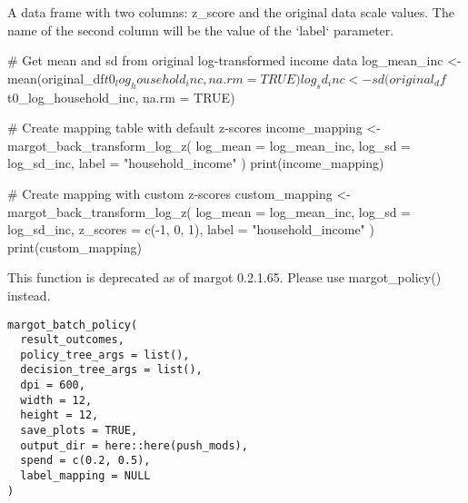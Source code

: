 \documentclass[a4paper]{book}
\begin{document}
%
\begin{Value}
A data frame with two columns: z\_score and the original data scale values.
The name of the second column will be the value of the `label` parameter.
\end{Value}
%
\begin{Examples}
\begin{ExampleCode}
# Get mean and sd from original log-transformed income data
log_mean_inc <- mean(original_df$t0_log_household_inc, na.rm = TRUE)
log_sd_inc <- sd(original_df$t0_log_household_inc, na.rm = TRUE)

# Create mapping table with default z-scores
income_mapping <- margot_back_transform_log_z(
  log_mean = log_mean_inc,
  log_sd = log_sd_inc,
  label = "household_income"
)
print(income_mapping)

# Create mapping with custom z-scores
custom_mapping <- margot_back_transform_log_z(
  log_mean = log_mean_inc,
  log_sd = log_sd_inc,
  z_scores = c(-1, 0, 1),
  label = "household_income"
)
print(custom_mapping)

\end{ExampleCode}
\end{Examples}
%
\begin{Description}
This function is deprecated as of margot 0.2.1.65. Please use margot\_policy() instead.
\end{Description}
%
\begin{Usage}
\begin{verbatim}
margot_batch_policy(
  result_outcomes,
  policy_tree_args = list(),
  decision_tree_args = list(),
  dpi = 600,
  width = 12,
  height = 12,
  save_plots = TRUE,
  output_dir = here::here(push_mods),
  spend = c(0.2, 0.5),
  label_mapping = NULL
)
\end{verbatim}
\end{Usage}
%
\end{document}
